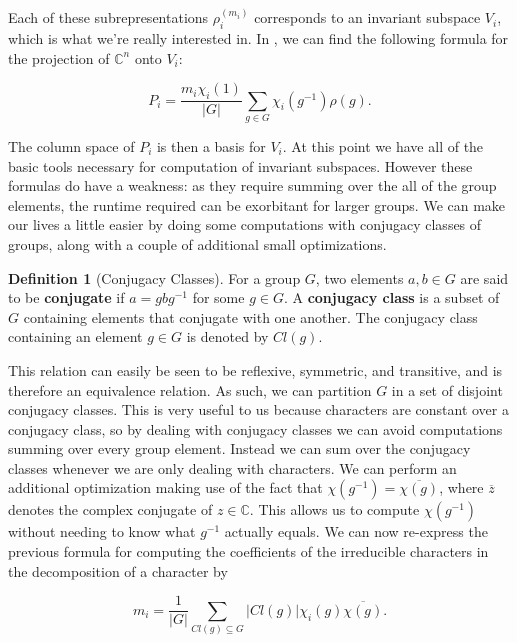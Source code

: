 \documentclass[11pt]{article} %
\theoremstyle{definition}
\newtheorem{definition}[theorem]{Definition}
\theoremstyle{remark}
\begin{document}
Each of these subrepresentations $\rho_i^{(m_i)}$ corresponds to an invariant subspace $V_i$, which is what we're really interested in. In \cite{char}, we can find the following formula for the projection of $\mathbb{C}^n$ onto $V_i$:

\begin{equation} \label{eq:projection}
P_i = \frac{m_i\chi_i(1)}{|G|} \sum_{g \in G} \chi_i(g^{-1})\rho(g).
\end{equation}

The column space of $P_i$ is then a basis for $V_i$. At this point we have all of the basic tools necessary for computation of invariant subspaces. However these formulas do have a weakness: as they require summing over the all of the group elements, the runtime required can be exorbitant for larger groups. We can make our lives a little easier by doing some computations with conjugacy classes of groups, along with a couple of additional small optimizations.

\begin{definition}[Conjugacy Classes]
For a group $G$, two elements $a, b \in G$ are said to be \textbf{conjugate} if $a = gbg^{-1}$ for some $g \in G$. A \textbf{conjugacy class} is a subset of $G$ containing elements that conjugate with one another. The conjugacy class containing an element $g \in G$ is denoted by $Cl(g)$.
\end{definition}

This relation can easily be seen to be reflexive, symmetric, and transitive, and is therefore an equivalence relation. As such, we can partition $G$ in a set of disjoint conjugacy classes. This is very useful to us because characters are constant over a conjugacy class, so by dealing with conjugacy classes we can avoid computations summing over every group element. Instead we can sum over the conjugacy classes whenever we are only dealing with characters. We can perform an additional optimization making use of the fact that $\chi(g^{-1}) = \overline{\chi(g)}$, where $\overline z$ denotes the complex conjugate of $z \in \mathbb{C}$. This allows us to compute $\chi(g^{-1})$ without needing to know what $g^{-1}$ actually equals. We can now re-express the previous formula for computing the coefficients of the irreducible characters in the decomposition of a character by

\begin{equation} \label{eq:chars}
m_i = \frac{1}{|G|} \sum_{Cl(g) \subseteq G} |Cl(g)| \chi_i(g) \overline{\chi(g)}.
\end{equation}
\end{document}
